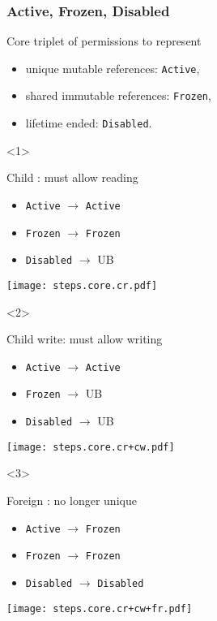 \begin{frame}[t]
    \frametitle{Active, Frozen, Disabled}
    Core triplet of permissions to represent
    \begin{itemize}
        \item unique mutable references: \texttt{Active},
        \item shared immutable references: \texttt{Frozen},
        \item lifetime ended: \texttt{Disabled}.
    \end{itemize}

    \begin{onlyenv}<1>
        \begin{block}{Child : must allow reading}
            \begin{itemize}
                \item \texttt{Active} \(\to\) \texttt{Active}
                \item \texttt{Frozen} \(\to\) \texttt{Frozen}
                \item \texttt{Disabled} \(\to\) UB
            \end{itemize}
        \end{block}
        \texttt{[image: steps.core.cr.pdf]}
    \end{onlyenv}

    \begin{onlyenv}<2>
        \begin{block}{Child write: must allow writing}
            \begin{itemize}
                \item \texttt{Active} \(\to\) \texttt{Active}
                \item \texttt{Frozen} \(\to\) UB
                \item \texttt{Disabled} \(\to\) UB
            \end{itemize}
        \end{block}
        \texttt{[image: steps.core.cr+cw.pdf]}
    \end{onlyenv}

    \begin{onlyenv}<3>
        \begin{block}{Foreign : no longer unique}
            \begin{itemize}
                \item \texttt{Active} \(\to\) \texttt{Frozen}
                \item \texttt{Frozen} \(\to\) \texttt{Frozen}
                \item \texttt{Disabled} \(\to\) \texttt{Disabled}
            \end{itemize}
        \end{block}
        \texttt{[image: steps.core.cr+cw+fr.pdf]}
    \end{onlyenv}


\end{frame}
